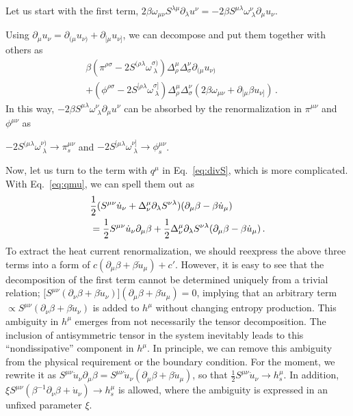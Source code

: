 \documentclass[prl,superscriptaddress,twocolumn,
  showpacs,preprintnumbers,amsmath,amssymb]{revtex4-1}
\newcommand{\p}{\partial}
\begin{document}
Let us start with the first term, $2\beta\omega_{\mu\nu} S^{\lambda\mu}\p_\lambda u^\nu = -2\beta S^{\mu\lambda}\omega^\nu_{\;\lambda}\partial_\mu u_\nu$.





Using $\partial_\mu u_\nu = \partial_{(\mu} u_{\nu)} + \partial_{[\mu} u_{\nu]}$, we can decompose and put them together with others as
\begin{equation}
  \begin{split}
  & \beta(\pi^{\rho\sigma} -2 S^{(\rho\lambda} \omega^{\sigma)}_{\;\lambda})
  \Delta^\mu_\rho \Delta^\nu_\sigma \partial_{(\mu} u_{\nu)} \\
  & + (\phi^{\rho\sigma} -2 S^{[\rho\lambda} \omega^{\sigma]}_{\;\lambda})
  \Delta^\mu_\rho \Delta^\nu_\sigma (2\beta\omega_{\mu\nu}
  + \partial_{[\mu} \beta u_{\nu]})\,.
  \end{split}
\end{equation}
In this way, $-2\beta S^{\mu\lambda} \omega^\nu_{\;\lambda}\partial_\mu u^\nu$ can be absorbed by the renormalization in $\pi^{\mu\nu}$ and $\phi^{\mu\nu}$ as








$-2S^{(\mu\lambda} \omega^{\nu)}_{\;\lambda} \to \pi_s^{\mu\nu}$ and
$-2S^{[\mu\lambda} \omega^{\nu]}_{\;\lambda} \to \phi_s^{\mu\nu}$.


Now, let us turn to the term with $q^\mu$ in Eq.~\eqref{eq:divS}, which is more complicated.  With Eq.~\eqref{eq:qmu}, we can spell them out as
\begin{align}
  & \frac{1}{2}(S^{\mu\nu} \dot{u}_\nu + \Delta^\mu_\nu \partial_\lambda S^{\nu\lambda})
    (\partial_\mu \beta - \beta \dot{u}_\mu) \notag\\
  &= \frac{1}{2} S^{\mu\nu} \dot{u}_\nu \partial_\mu\beta
    + \frac{1}{2} \Delta^\mu_\nu \partial_\lambda S^{\nu\lambda} (\partial_\mu\beta - \beta\dot{u}_\mu )\,.
\end{align}
To extract the heat current renormalization, we should reexpress the above three terms into a form of $c(\partial_\mu\beta + \beta\dot{u}_\mu) + c'$.  However, it is easy to see that the decomposition of the first term cannot be determined uniquely from a trivial relation; $\bigl[ S^{\mu\nu}(\partial_\nu\beta+\beta\dot{u}_\nu) \bigr](\partial_\mu\beta + \beta\dot{u}_\mu) = 0$, implying that an arbitrary term $\propto S^{\mu\nu}(\partial_\nu\beta+\beta\dot{u}_\nu)$ is added to $h^\mu$ without changing entropy production.  This ambiguity in $h^\mu$ emerges from not necessarily the tensor decomposition.  The inclusion of antisymmetric tensor in the system inevitably leads to this ``nondissipative'' component in $h^\mu$.  In principle, we can remove this ambiguity from the physical requirement or the boundary condition.
For the moment, we rewrite it as $S^{\mu\nu}\dot{u}_\nu \partial_\mu\beta = S^{\mu\nu}\dot{u}_\nu (\partial_\mu\beta + \beta\dot{u}_\mu)$, so that $\frac{1}{2}S^{\mu\nu}\dot{u}_\nu \to h_s^\mu$.  In addition,
$\xi S^{\mu\nu}(\beta^{-1} \partial_\nu\beta + \dot{u}_\nu)\to h_s^\mu$ is allowed, where the ambiguity is expressed in an unfixed parameter $\xi$.
\end{document}
